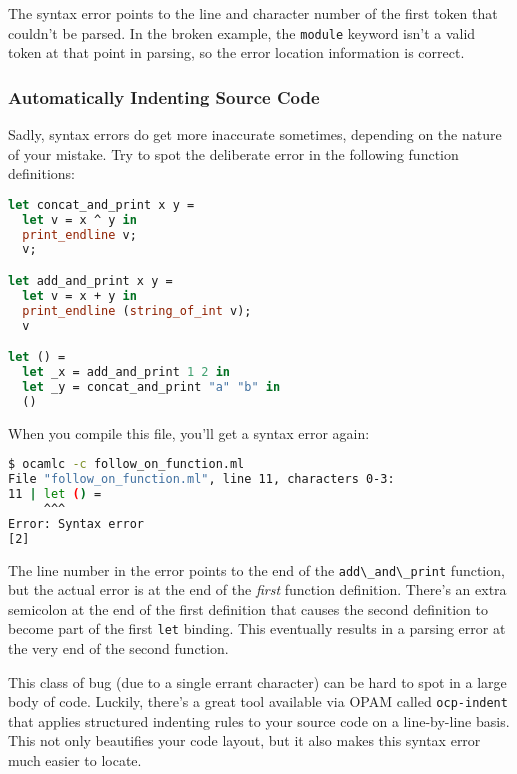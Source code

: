 The syntax error points to the line and character number of the first
token that couldn't be parsed. In the broken example, the
\passthrough{\lstinline!module!} keyword isn't a valid token at that
point in parsing, so the error location information is correct.

\hypertarget{automatically-indenting-source-code}{%
\subsubsection{Automatically Indenting Source
Code}\label{automatically-indenting-source-code}}

Sadly, syntax errors do get more inaccurate sometimes, depending on the
nature of your mistake. Try to spot the deliberate error in the
following function definitions:

\begin{lstlisting}[language=Caml]
let concat_and_print x y =
  let v = x ^ y in
  print_endline v;
  v;

let add_and_print x y =
  let v = x + y in
  print_endline (string_of_int v);
  v

let () =
  let _x = add_and_print 1 2 in
  let _y = concat_and_print "a" "b" in
  ()
\end{lstlisting}

When you compile this file, you'll get a syntax error again:

\begin{lstlisting}[language=bash]
$ ocamlc -c follow_on_function.ml
File "follow_on_function.ml", line 11, characters 0-3:
11 | let () =
     ^^^
Error: Syntax error
[2]
\end{lstlisting}

The line number in the error points to the end of the
\passthrough{\lstinline!add\_and\_print!} function, but the actual error
is at the end of the \emph{first} function definition. There's an extra
semicolon at the end of the first definition that causes the second
definition to become part of the first \passthrough{\lstinline!let!}
binding. This eventually results in a parsing error at the very end of
the second function.

This class of bug (due to a single errant character) can be hard to spot
in a large body of code. Luckily, there's a great tool available via
OPAM called \passthrough{\lstinline!ocp-indent!} that applies structured
indenting rules to your source code on a line-by-line basis. This not
only beautifies your code layout, but it also makes this syntax error
much easier to locate.

